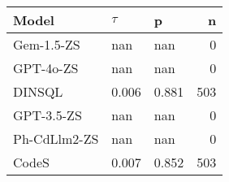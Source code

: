 \begin{tabular}{lllr}
\toprule
Model & $\tau$ & p & n \\
\midrule
Gem-1.5-ZS & nan & nan & 0 \\
GPT-4o-ZS & nan & nan & 0 \\
DINSQL & 0.006 & 0.881 & 503 \\
GPT-3.5-ZS & nan & nan & 0 \\
Ph-CdLlm2-ZS & nan & nan & 0 \\
CodeS & 0.007 & 0.852 & 503 \\
\bottomrule
\end{tabular}
